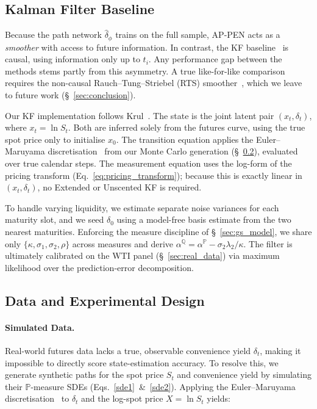\documentclass[11pt, a4paper]{article}
\begin{document}
\subsection{Kalman Filter Baseline}
\label{sec:kalman}

Because the path network $\hat{\delta}_\phi$ trains on the full sample, AP-PEN acts as a \textit{smoother} with access to future information. In contrast, the KF baseline~\cite{Schwartz1997TheHedging} is causal, using information only up to $t_i$. Any performance gap between the methods stems partly from this asymmetry. A true like-for-like comparison requires the non-causal Rauch--Tung--Striebel (RTS) smoother~\cite{rauch1965maximum}, which we leave to future work (\S~\ref{sec:conclusion}).

Our KF implementation follows Krul~\cite{krul2008calibration}. The state is the joint latent pair $(x_t, \delta_t)$, where $x_t=\ln S_t$. Both are inferred solely from the futures curve, using the true spot price only to initialise $x_0$. The transition equation applies the Euler--Maruyama discretisation~\cite{maruyama1955continuous} from our Monte Carlo generation (\S~\ref{sec:experimental_design}), evaluated over true calendar steps. The measurement equation uses the log-form of the pricing transform (Eq.~\ref{eq:pricing_transform}); because this is exactly linear in $(x_t, \delta_t)$, no Extended or Unscented KF is required. 

To handle varying liquidity, we estimate separate noise variances for each maturity slot, and we seed $\delta_0$ using a model-free basis estimate from the two nearest maturities. Enforcing the measure discipline of \S~\ref{sec:gs_model}, we share only $\{\kappa,\sigma_1,\sigma_2,\rho\}$ across measures and derive $\alpha^{\mathbb{Q}} = \alpha^{\mathbb{P}}-\sigma_2\lambda_2/\kappa$. The filter is ultimately calibrated on the WTI panel (\S~\ref{sec:real_data}) via maximum likelihood over the prediction-error decomposition.

\subsection{Data and Experimental Design}
\label{sec:experimental_design}

\paragraph{Simulated Data.}Real-world futures data lacks a true, observable convenience yield $\delta_t$, making it impossible to directly score state-estimation accuracy. To resolve this, we generate synthetic paths for the spot price $S_t$ and convenience yield by simulating their $\mathbb{P}$-measure SDEs (Eqs.~\ref{sde1}~\&~\ref{sde2}). Applying the Euler--Maruyama discretisation~\cite{maruyama1955continuous, higham2001algorithmic} to $\delta_t$ and the log-spot price $X = \ln S_t$ yields:
\end{document}
